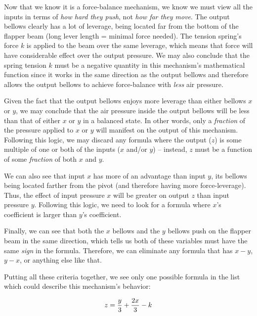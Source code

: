 \vskip 10pt

Now that we know it is a force-balance mechanism, we know we must view all the inputs in terms of {\it how hard they push}, not {\it how far they move}.  The output bellows clearly has a lot of leverage, being located far from the bottom of the flapper beam (long lever length = minimal force needed).  The tension spring's force $k$ is applied to the beam over the same leverage, which means that force will have considerable effect over the output pressure.  We may also conclude that the spring tension $k$ must be a negative quantity in this mechanism's mathematical function since it works in the same direction as the output bellows and therefore allows the output bellows to achieve force-balance with {\it less} air pressure.  

Given the fact that the output bellows enjoys more leverage than either bellows $x$ or $y$, we may conclude that the air pressure inside the output bellows will be less than that of either $x$ or $y$ in a balanced state.  In other words, only a {\it fraction} of the pressure applied to $x$ or $y$ will manifest on the output of this mechanism.  Following this logic, we may discard any formula where the output ($z$) is some multiple of one or both of the inputs ($x$ and/or $y$) -- instead, $z$ must be a function of some {\it fraction} of both $x$ and $y$. 

\vskip 10pt

We can also see that input $x$ has more of an advantage than input $y$, its bellows being located farther from the pivot (and therefore having more force-leverage).  Thus, the effect of input pressure $x$ will be greater on output $z$ than input pressure $y$.  Following this logic, we need to look for a formula where $x$'s coefficient is larger than $y$'s coefficient.

\vskip 10pt

Finally, we can see that both the $x$ bellows and the $y$ bellows push on the flapper beam in the same direction, which tells us both of these variables must have the same {\it sign} in the formula.  Therefore, we can eliminate any formula that has $x-y$, $y-x$, or anything else like that.

\vskip 10pt

Putting all these criteria together, we see only one possible formula in the list which could describe this mechanism's behavior:

$$z = {y \over 3} + {2x \over 3} - k$$





